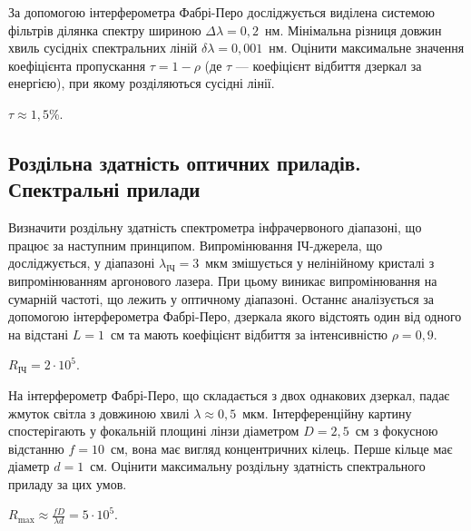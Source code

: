 \begin{problem}%
    За допомогою інтерферометра Фабрі-Перо досліджується виділена системою фільтрів ділянка спектру шириною $ \Delta\lambda = 0,2 $~нм. Мінімальна різниця довжин хвиль сусідніх спектральних ліній $ \delta\lambda = 0,001 $~нм. Оцінити максимальне значення коефіцієнта пропускання $\tau = 1- \rho$ (де $\tau$ --- коефіцієнт відбиття дзеркал за енергією), при якому розділяються сусідні лінії.
    \begin{solution}
        $\tau \approx 1,5$\%.
    \end{solution}
\end{problem}






\subsection*{Роздільна здатність оптичних приладів. Спектральні прилади}


\begin{problem}%
    Визначити роздільну здатність спектрометра інфрачервоного діапазоні, що працює за наступним принципом. Випромінювання ІЧ-джерела, що досліджується, у діапазоні $ \lambda_\text{ІЧ} = 3$~мкм змішується у нелінійному кристалі з випромінюванням аргонового лазера. При цьому виникає випромінювання на сумарній частоті, що лежить у оптичному діапазоні. Останнє аналізується за допомогою інтерферометра Фабрі-Перо, дзеркала якого відстоять один від одного на відстані $ L = 1 $~см та мають коефіцієнт відбиття за інтенсивністю $ \rho = 0,9  $.
    \begin{solution}
        $R_\text{ІЧ} = 2\cdot10^5$.
    \end{solution}
\end{problem}


\begin{problem}%
    На інтерферометр Фабрі-Перо, що складається з двох однакових
    дзеркал, падає жмуток світла з довжиною хвилі $ \lambda \approx  0,5 $~мкм.
    Інтерференційну картину спостерігають у фокальній площині лінзи
    діаметром $ D = 2,5 $~см з фокусною відстанню $ f = 10 $~см, вона має вигляд
    концентричних кілець. Перше кільце має діаметр $ d = 1 $~см. Оцінити
    максимальну роздільну здатність спектрального приладу за цих умов.
    \begin{solution}
        $R_{\max} \approx \frac{fD}{\lambda d} = 5\cdot10^5$.
    \end{solution}
\end{problem}


